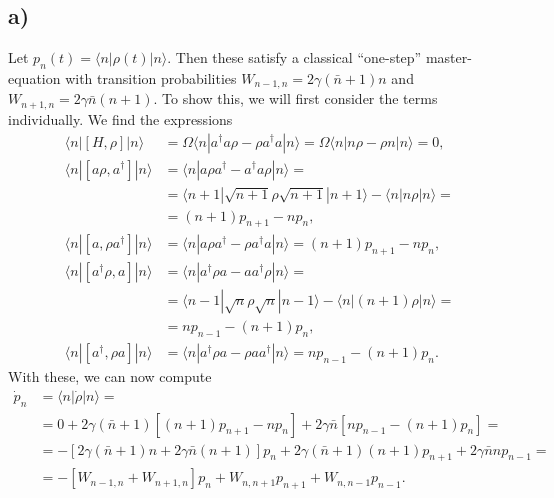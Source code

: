 \documentclass[english, parskip=full]{scrartcl}
\newcommand{\braket}{}
\newcommand{\kla}{}
\newcommand{\klam}{}
\begin{document}
\subsection*{a)}
Let $p_n(t) = \braket\langle n | \rho(t) | n \rangle$.
Then these satisfy a classical ``one-step'' master-equation with transition probabilities $W_{n-1,n} = 2\gamma\kla\left( \bar{n} + 1 \right)n$ and $W_{n+1,n} = 2\gamma\bar{n}\kla\left( n+1 \right)$.
To show this, we will first consider the terms individually.
We find the expressions
\begin{align}
\braket\langle n | \klam\left[ H,\rho \right] | n \rangle &= \Omega \braket\langle n | a^\dagger a\rho - \rho a^\dagger a | n \rangle = \Omega\braket\langle n | n\rho - \rho n | n \rangle = 0,\\
\braket\langle n | \klam\left[ a\rho, a^\dagger \right] | n \rangle &= \braket\langle n | a\rho a^\dagger - a^\dagger a\rho | n \rangle = \\
&= \braket\langle n+1 | \sqrt{n+1}\rho\sqrt{n+1} | n+1 \rangle - \braket\langle n | n\rho  | n \rangle = \\
&= \kla\left( n+1 \right)p_{n+1} - np_n,\\
\braket\langle n | \klam\left[ a,\rho a^\dagger \right] | n \rangle &= \braket\langle n | a\rho a^\dagger - \rho a^\dagger a | n \rangle = \kla\left( n+1 \right)p_{n+1} - np_n,\\
\braket\langle n | \klam\left[ a^\dagger\rho, a \right] | n  \rangle &= \braket\langle n | a^\dagger\rho a - aa^\dagger\rho | n \rangle = \\
&= \braket\langle n-1 | \sqrt{n}\rho \sqrt{n} | n-1 \rangle - \braket\langle n | (n+1)\rho | n \rangle = \\
&= np_{n-1} - (n+1)p_n,\\
\braket\langle n | \klam\left[ a^\dagger, \rho a \right] | n  \rangle &= \braket\langle n | a^\dagger\rho a - \rho aa^\dagger | n \rangle = np_{n-1} - (n+1)p_n.
\end{align}
With these, we can now compute
\begin{align}
\dot{p}_n &= \braket\langle n | \dot{\rho} | n \rangle = \\
&= 0 + 2\gamma\kla\left( \bar{n}+1 \right)\klam\left[ (n+1)p_{n+1} - np_n \right] + 2\gamma\bar{n}\klam\left[ np_{n-1} - (n+1)p_n \right] = \\
&= -\klam\left[ 2\gamma\kla\left( \bar{n}+1 \right)n + 2\gamma\bar{n}(n+1) \right]p_n + 2\gamma (\bar{n}+1)(n+1)p_{n+1} + 2\gamma\bar{n}np_{n-1} = \\
&= -\klam\left[ W_{n-1,n} + W_{n+1,n} \right]p_n + W_{n,n+1}p_{n+1} + W_{n,n-1}p_{n-1}.
\end{align}
\end{document}
